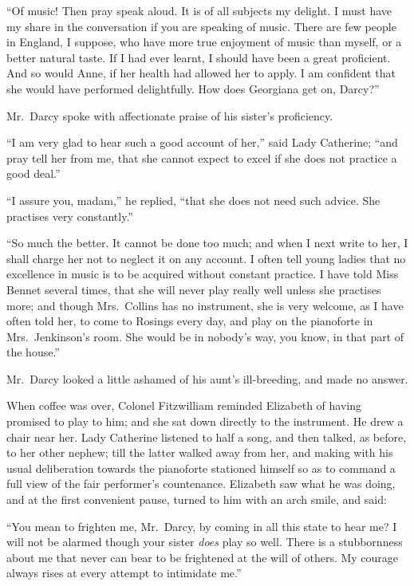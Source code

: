 \documentclass[12pt,english]{book}
\begin{document}
{}``Of music! Then pray speak aloud. It is of all subjects my delight.
I must have my share in the conversation if you are speaking of music.
There are few people in England, I suppose, who have more true enjoyment
of music than myself, or a better natural taste. If I had ever learnt,
I should have been a great proficient. And so would Anne, if her health
had allowed her to apply. I am confident that she would have performed
delightfully. How does Georgiana get on, Darcy?''\ 

Mr.\ Darcy spoke with affectionate praise of his sister's proficiency.

{}``I am very glad to hear such a good account of her,'' said Lady
Catherine; {}``and pray tell her from me, that she cannot expect
to excel if she does not practice a good deal.''

{}``I assure you, madam,'' he replied, {}``that she does not need
such advice. She practises very constantly.''

{}``So much the better. It cannot be done too much; and when I next
write to her, I shall charge her not to neglect it on any account.
I often tell young ladies that no excellence in music is to be acquired
without constant practice. I have told Miss Bennet several times,
that she will never play really well unless she practises more; and
though Mrs.\ Collins has no instrument, she is very welcome, as I
have often told her, to come to Rosings every day, and play on the
pianoforte in Mrs.\ Jenkinson's room. She would be in nobody's way,
you know, in that part of the house.''

Mr.\ Darcy looked a little ashamed of his aunt's ill-breeding, and
made no answer.

When coffee was over, Colonel Fitzwilliam reminded Elizabeth of having
promised to play to him; and she sat down directly to the instrument.
He drew a chair near her. Lady Catherine listened to half a song,
and then talked, as before, to her other nephew; till the latter walked
away from her, and making with his usual deliberation towards the
pianoforte stationed himself so as to command a full view of the fair
performer's countenance. Elizabeth saw what he was doing, and at the
first convenient pause, turned to him with an arch smile, and said:

{}``You mean to frighten me, Mr.\ Darcy, by coming in all this state
to hear me? I will not be alarmed though your sister \textit{does}
play so well. There is a stubbornness about me that never can bear
to be frightened at the will of others. My courage always rises at
every attempt to intimidate me.''
\end{document}
